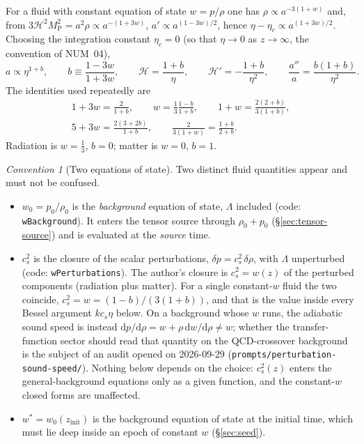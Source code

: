 \documentclass[11pt,a4paper]{article}
\newcommand{\cH}{\mathcal{H}}
\newcommand{\MP}{M_{\mathrm{P}}}
\newcommand{\dd}{\mathrm{d}}
\newcommand{\zinit}{z_{\mathrm{init}}}
\newcommand{\wstar}{w^{*}}
\newcommand{\note}[1]{\textsf{#1}}
\theoremstyle{remark}
\newtheorem*{convention}{Convention}
\begin{document}
For a fluid with constant equation of state $w = p/\rho$ one has $\rho\propto a^{-3(1+w)}$ and, from $3\cH^2\MP^2 = a^2\rho\propto a^{-(1+3w)}$, $a'\propto a^{(1-3w)/2}$, hence $\eta-\eta_c\propto a^{(1+3w)/2}$. Choosing the integration constant $\eta_c = 0$ (so that $\eta\to0$ as $z\to\infty$, the convention of \note{NUM}~04),
\begin{equation}
a\propto\eta^{1+b},\qquad
b \equiv \frac{1-3w}{1+3w},\qquad
\cH = \frac{1+b}{\eta},\qquad
\cH' = -\frac{1+b}{\eta^2},\qquad
\frac{a''}{a} = \frac{b(1+b)}{\eta^2}.
\label{eq:constant-w-background}
\end{equation}
The identities used repeatedly are
\begin{equation}
\begin{gathered}
1+3w = \frac{2}{1+b},\qquad
w = \frac{1}{3}\frac{1-b}{1+b},\qquad
1+w = \frac{2(2+b)}{3(1+b)},\\
5+3w = \frac{2(3+2b)}{1+b},\qquad
\frac{2}{3(1+w)} = \frac{1+b}{2+b}.
\end{gathered}
\label{eq:w-b-identities}
\end{equation}
Radiation is $w=\tfrac13$, $b=0$; matter is $w=0$, $b=1$.

\begin{convention}[Two equations of state]
Two distinct fluid quantities appear and must not be confused.
\begin{itemize}
\item $w_0 = p_0/\rho_0$ is the \emph{background} equation of state, $\Lambda$ included (code: \texttt{wBackground}). It enters the tensor source through $\rho_0+p_0$ (\S\ref{sec:tensor-source}) and is evaluated at the \emph{source} time.
\item $c_s^2$ is the closure of the scalar perturbations, $\delta p = c_s^2\,\delta\rho$, with $\Lambda$ unperturbed (code: \texttt{wPerturbations}). The author's closure is $c_s^2 = w(z)$ of the perturbed components (radiation plus matter). For a single constant-$w$ fluid the two coincide, $c_s^2 = w = (1-b)/(3(1+b))$, and that is the value inside every Bessel argument $kc_s\eta$ below. On a background whose $w$ runs, the adiabatic sound speed is instead $\dd p/\dd\rho = w + \rho\,\dd w/\dd\rho\neq w$; whether the transfer-function sector should read that quantity on the QCD-crossover background is the subject of an audit opened on 2026-09-29 (\texttt{prompts/perturbation-sound-speed/}). Nothing below depends on the choice: $c_s^2(z)$ enters the general-background equations only as a given function, and the constant-$w$ closed forms are unaffected.
\item $\wstar = w_0(\zinit)$ is the background equation of state at the initial time, which must lie deep inside an epoch of constant $w$ (\S\ref{sec:seed}).
\end{itemize}
\end{convention}
\end{document}
